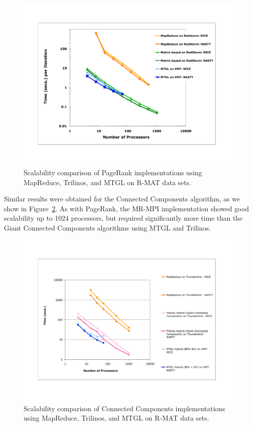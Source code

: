 \begin{figure}[h!]
\includegraphics[width=\textwidth]{fig_pagerank_big.pdf}
\caption{Scalability comparison of PageRank implementations using MapReduce,
Trilinos, and MTGL on R-MAT data sets.}
\label{fig:prbig}
\end{figure}

Similar results were obtained for the Connected Components algorithm, as
we show in Figure~\ref{fig:ccbig}.  As with PageRank, the MR-MPI implementation
showed good scalability up to 1024 processors, but required significantly
more time than the Giant Connected Components algorithms using MTGL and
Trilinos.

\begin{figure}[h!]
\includegraphics[width=\textwidth]{fig_cc_big.pdf}
\caption{Scalability comparison of Connected Components implementations using MapReduce,
Trilinos, and MTGL on R-MAT data sets.}
\label{fig:ccbig}
\end{figure}

